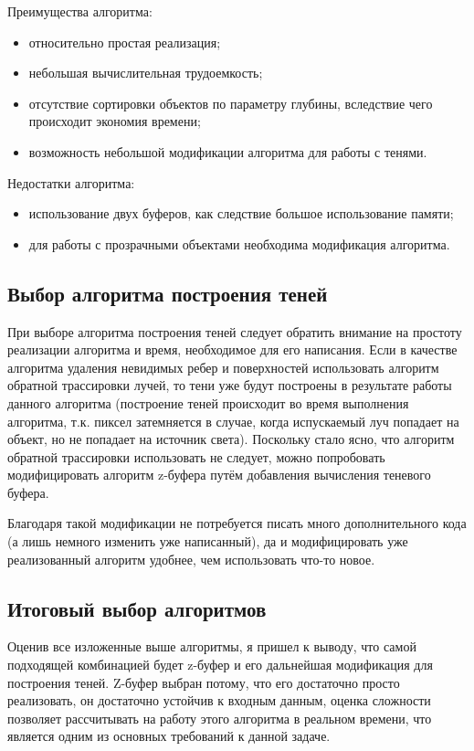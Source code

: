 Преимущества алгоритма:
\begin{itemize}[label=---]
    \item относительно простая реализация;
    \item небольшая вычислительная трудоемкость;
    \item отсутствие сортировки объектов по параметру глубины, вследствие чего происходит экономия времени;
    \item возможность небольшой модификации алгоритма для работы с тенями.
\end{itemize}

Недостатки алгоритма:
\begin{itemize}[label=---]
    \item использование двух буферов, как следствие большое использование памяти;
    \item для работы с прозрачными объектами необходима модификация алгоритма.
\end{itemize}

\subsection{Выбор алгоритма построения теней}

При выборе алгоритма построения теней следует обратить внимание на простоту реализации алгоритма и время, необходимое для его написания. Если в качестве алгоритма удаления невидимых ребер и поверхностей использовать алгоритм обратной трассировки лучей, то тени уже будут построены в результате работы данного алгоритма (построение теней происходит во время выполнения алгоритма, т.к. пиксел затемняется в случае, когда испускаемый луч попадает на объект, но не попадает на источник света). Поскольку стало ясно, что алгоритм обратной трассировки использовать не следует, можно попробовать модифицировать алгоритм z-буфера путём добавления вычисления теневого буфера.

Благодаря такой модификации не потребуется писать много дополнительного кода (а лишь немного изменить уже написанный), да и модифицировать уже реализованный алгоритм удобнее, чем использовать что-то новое.

\subsection{Итоговый выбор алгоритмов}

Оценив все изложенные выше алгоритмы, я пришел к выводу, что самой подходящей комбинацией будет z-буфер и его дальнейшая модификация для построения теней. Z-буфер выбран потому, что его достаточно просто реализовать, он достаточно устойчив к входным данным, оценка сложности позволяет рассчитывать на работу этого алгоритма в реальном времени, что является одним из основных требований к данной задаче.

